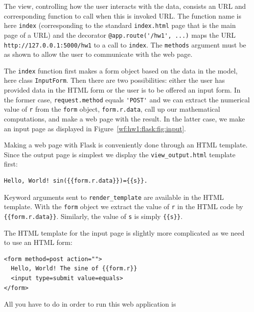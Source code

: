 \documentclass[%
oneside,                 %
final,                   %
10pt]{article}
\begin{document}
The view, controlling how the user interacts with the data, consists
an URL and corresponding function to call when this is invoked URL.
The function name is here \Verb!index! (corresponding to the standard
\Verb!index.html! page that is the main page of a URL) and the
decorator \Verb!@app.route('/hw1', ...)! maps the URL
\Verb!http://127.0.0.1:5000/hw1! to a call to \Verb!index!.
The \Verb!methods! argument must be as shown to allow the user to communicate
with the web page.


The \Verb!index! function first makes a form object based on the data in
the model, here class \Verb!InputForm!. Then there are two possibilities:
either the user has provided data in the HTML form or the user is
to be offered an input form. In the former case, \Verb!request.method!
equals \Verb!'POST'! and we can extract the numerical value of \Verb!r!
from the \Verb!form! object, \Verb!form.r.data!, call up our mathematical
computations, and make a web page with the result.
In the latter case, we make an input page as displayed in
Figure~\ref{wf:hw1:flask:fig:input}.


Making a web page with Flask is conveniently done through an HTML
template. Since the output page is simplest we display the
\Verb!view_output.html! template first:

\begin{Verbatim}[numbers=none,fontsize=\fontsize{9pt}{9pt},baselinestretch=0.85]
Hello, World! sin({{form.r.data}})={{s}}.
\end{Verbatim}

Keyword arguments sent to \Verb!render_template! are available in the
HTML template. With the \Verb!form! object we extract the value of
\Verb!r! in the HTML code by \Verb!{{form.r.data}}!. Similarly, the value of \Verb!s!
is simply \Verb!{{s}}!.

The HTML template for the input page is slightly more complicated
as we need to use an HTML form:

\begin{Verbatim}[numbers=none,fontsize=\fontsize{9pt}{9pt},baselinestretch=0.85]
<form method=post action="">
  Hello, World! The sine of {{form.r}}
  <input type=submit value=equals>
</form>
\end{Verbatim}

All you have to do in order to run this web application is
\end{document}
